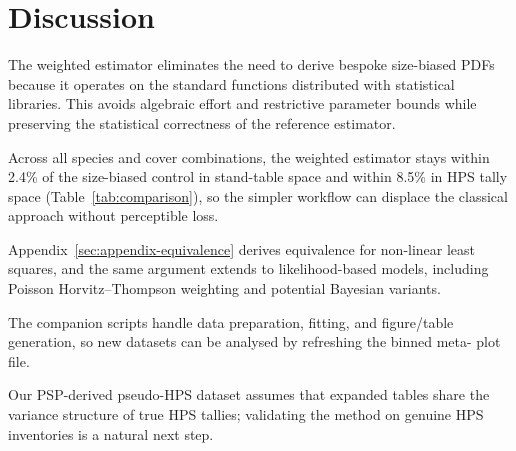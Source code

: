 \section{Discussion}

The weighted estimator eliminates the need to derive bespoke size-biased
PDFs because it operates on the standard functions distributed with
statistical libraries. This avoids algebraic effort and restrictive
parameter bounds while preserving the statistical correctness of the
reference estimator.

Across all species and cover combinations, the weighted estimator stays
within 2.4\% of the size-biased control in stand-table space and within
8.5\% in HPS tally space (Table~\ref{tab:comparison}), so the simpler
workflow can displace the classical approach without perceptible loss.

Appendix~\ref{sec:appendix-equivalence} derives equivalence for non-linear
least squares, and the same argument extends to likelihood-based models,
including Poisson Horvitz--Thompson weighting and potential Bayesian
variants.

The companion scripts handle data preparation, fitting, and figure/table
generation, so new datasets can be analysed by refreshing the binned meta-
plot file.

Our PSP-derived pseudo-HPS dataset assumes that expanded tables share the
variance structure of true HPS tallies; validating the method on genuine HPS
inventories is a natural next step.
